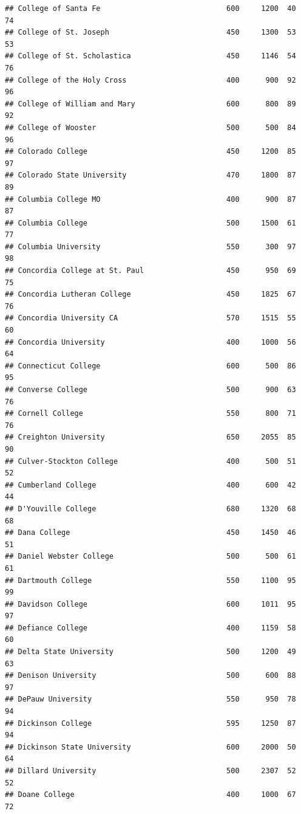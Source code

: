 \documentclass[
]{article}
\begin{document}
\begin{verbatim}
## College of Santa Fe                             600     1200  40       74
## College of St. Joseph                           450     1300  53       53
## College of St. Scholastica                      450     1146  54       76
## College of the Holy Cross                       400      900  92       96
## College of William and Mary                     600      800  89       92
## College of Wooster                              500      500  84       96
## Colorado College                                450     1200  85       97
## Colorado State University                       470     1800  87       89
## Columbia College MO                             400      900  87       87
## Columbia College                                500     1500  61       77
## Columbia University                             550      300  97       98
## Concordia College at St. Paul                   450      950  69       75
## Concordia Lutheran College                      450     1825  67       76
## Concordia University CA                         570     1515  55       60
## Concordia University                            400     1000  56       64
## Connecticut College                             600      500  86       95
## Converse College                                500      900  63       76
## Cornell College                                 550      800  71       76
## Creighton University                            650     2055  85       90
## Culver-Stockton College                         400      500  51       52
## Cumberland College                              400      600  42       44
## D'Youville College                              680     1320  68       68
## Dana College                                    450     1450  46       51
## Daniel Webster College                          500      500  61       61
## Dartmouth College                               550     1100  95       99
## Davidson College                                600     1011  95       97
## Defiance College                                400     1159  58       60
## Delta State University                          500     1200  49       63
## Denison University                              500      600  88       97
## DePauw University                               550      950  78       94
## Dickinson College                               595     1250  87       94
## Dickinson State University                      600     2000  50       64
## Dillard University                              500     2307  52       52
## Doane College                                   400     1000  67       72

\end{verbatim}
\end{document}
